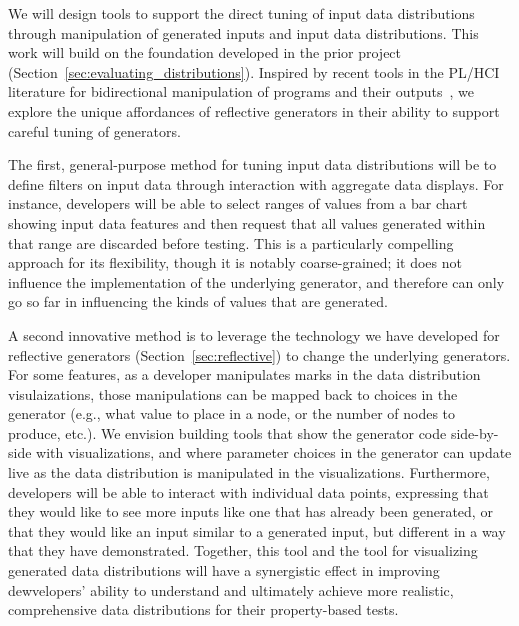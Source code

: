We will design tools to support the direct tuning of input data distributions
through manipulation of generated inputs and input data distributions. This
work will build on the foundation developed in the prior project
(Section~\ref{sec:evaluating_distributions}). Inspired by recent tools in the PL/HCI literature
for bidirectional manipulation of programs and their
outputs~\cite{ref:hempel2019sketch,ref:kery2020mage,ref:omar2012active,ref:omar2021filling},
we explore the unique affordances of reflective generators in their ability to
support careful tuning of generators.

The first, general-purpose method for tuning input data distributions will be to
define filters on input data through interaction with aggregate data displays.
For instance, developers will be able to select ranges of values from a bar
chart showing input data features and then request that all values generated
within that range are discarded before testing. This is a particularly
compelling approach for its flexibility, though it is notably coarse-grained;
it does not influence the implementation of the underlying generator, and
therefore can only go so far in influencing the kinds of values that are
generated.

A second innovative method is to leverage the technology we have developed for
reflective generators (Section~\ref{sec:reflective}) to change the underlying
generators. For some features, as a developer manipulates marks in the data
distribution visulaizations, those manipulations can be mapped back to choices
in the generator (e.g., what value to place in a node, or the number of nodes to
produce, etc.). We envision building tools that show the generator code
side-by-side with visualizations, and where parameter choices in the generator
can update live as the data distribution is manipulated in the visualizations.
Furthermore, developers will be able to interact with individual data points,
expressing that they would like to see more inputs like one that has already
been generated, or that they would like an input similar to a generated input,
but different in a way that they have demonstrated. Together, this tool and the
tool for visualizing generated data distributions will have a synergistic effect
in improving dewvelopers' ability to understand and ultimately achieve more
realistic, comprehensive data distributions for their property-based tests.


